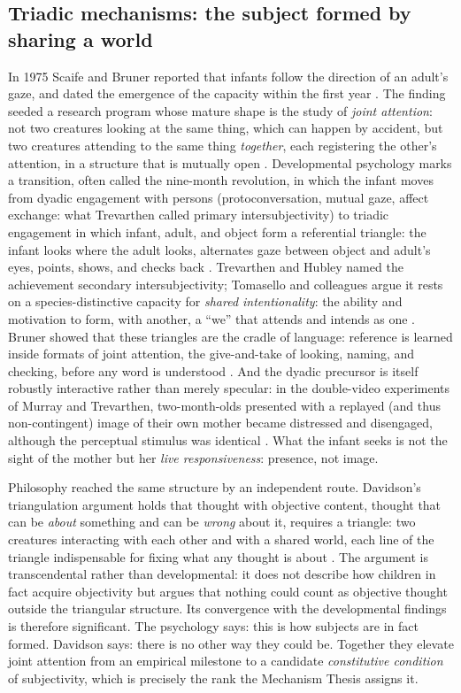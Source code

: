 \documentclass[11pt,a4paper]{article}
\theoremstyle{seriesthm}
\begin{document}
\subsection{Triadic mechanisms: the subject formed by sharing a world}
\label{p05:sec:triadic}

In 1975 Scaife and Bruner reported that infants follow the direction of an adult's gaze, and dated the emergence of the capacity within the first year \parencite{scaife1975}. The finding seeded a research program whose mature shape is the study of \emph{joint attention}: not two creatures looking at the same thing, which can happen by accident, but two creatures attending to the same thing \emph{together}, each registering the other's attention, in a structure that is mutually open \parencite{tomasello1995}. Developmental psychology marks a transition, often called the nine-month revolution, in which the infant moves from dyadic engagement with persons (protoconversation, mutual gaze, affect exchange: what Trevarthen called primary intersubjectivity) to triadic engagement in which infant, adult, and object form a referential triangle: the infant looks where the adult looks, alternates gaze between object and adult's eyes, points, shows, and checks back \parencite{trevarthen1979, trevarthen1978}. Trevarthen and Hubley named the achievement secondary intersubjectivity; Tomasello and colleagues argue it rests on a species-distinctive capacity for \emph{shared intentionality}: the ability and motivation to form, with another, a ``we'' that attends and intends as one \parencite{tomasello2005, tomasello2014}. Bruner showed that these triangles are the cradle of language: reference is learned inside formats of joint attention, the give-and-take of looking, naming, and checking, before any word is understood \parencite{bruner1983}. And the dyadic precursor is itself robustly interactive rather than merely specular: in the double-video experiments of Murray and Trevarthen, two-month-olds presented with a replayed (and thus non-contingent) image of their own mother became distressed and disengaged, although the perceptual stimulus was identical \parencite{murray1985}. What the infant seeks is not the sight of the mother but her \emph{live responsiveness}: presence, not image.

Philosophy reached the same structure by an independent route. Davidson's triangulation argument holds that thought with objective content, thought that can be \emph{about} something and can be \emph{wrong} about it, requires a triangle: two creatures interacting with each other and with a shared world, each line of the triangle indispensable for fixing what any thought is about \parencite{davidson2001}. The argument is transcendental rather than developmental: it does not describe how children in fact acquire objectivity but argues that nothing could count as objective thought outside the triangular structure. Its convergence with the developmental findings is therefore significant. The psychology says: this is how subjects are in fact formed. Davidson says: there is no other way they could be. Together they elevate joint attention from an empirical milestone to a candidate \emph{constitutive condition} of subjectivity, which is precisely the rank the Mechanism Thesis assigns it.
\end{document}
